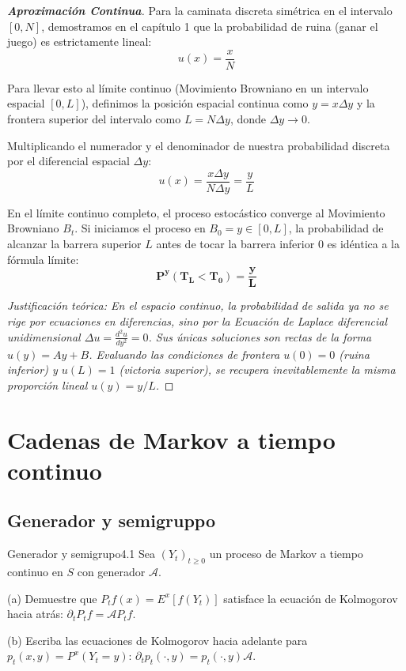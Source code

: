 \documentclass[10pt,a4paper]{article}
\begin{document}
\begin{proof}[\textbf{Aproximación Continua}]
    Para la caminata discreta simétrica en el intervalo $[0, N]$, demostramos en el capítulo 1 que la probabilidad de ruina (ganar el juego) es estrictamente lineal:
    \[ u(x) = \frac{x}{N} \]

    Para llevar esto al límite continuo (Movimiento Browniano en un intervalo espacial $[0, L]$), definimos la posición espacial continua como $y = x \Delta y$ y la frontera superior del intervalo como $L = N \Delta y$, donde $\Delta y \to 0$. 
    
    Multiplicando el numerador y el denominador de nuestra probabilidad discreta por el diferencial espacial $\Delta y$:
    \[ u(x) = \frac{x \Delta y}{N \Delta y} = \frac{y}{L} \]

    En el límite continuo completo, el proceso estocástico converge al Movimiento Browniano $B_t$. Si iniciamos el proceso en $B_0 = y \in [0, L]$, la probabilidad de alcanzar la barrera superior $L$ antes de tocar la barrera inferior $0$ es idéntica a la fórmula límite:
    \[ \mathbf{P^y(T_L < T_0) = \frac{y}{L}} \]
    
    \textit{Justificación teórica: En el espacio continuo, la probabilidad de salida ya no se rige por ecuaciones en diferencias, sino por la Ecuación de Laplace diferencial unidimensional $\Delta u = \frac{d^2u}{dy^2} = 0$. Sus únicas soluciones son rectas de la forma $u(y) = Ay+B$. Evaluando las condiciones de frontera $u(0)=0$ (ruina inferior) y $u(L)=1$ (victoria superior), se recupera inevitablemente la misma proporción lineal $u(y) = y/L$.}
\end{proof}

\newpage

\section{Cadenas de Markov a tiempo continuo}
\subsection{Generador y semigruppo}

\begin{ejercicio}{Generador y semigrupo}{4.1}
    Sea $(Y_t)_{t \ge 0}$ un proceso de Markov a tiempo continuo en $S$ con generador $\mathcal{A}$.
    
    (a) Demuestre que $P_t f(x) = E^x[f(Y_t)]$ satisface la ecuación de Kolmogorov hacia atrás: $\partial_t P_t f = \mathcal{A}P_t f$.
    
    (b) Escriba las ecuaciones de Kolmogorov hacia adelante para $p_t(x,y) = P^x(Y_t = y)$: $\partial_t p_t(\cdot, y) = p_t(\cdot, y)\mathcal{A}$.
\end{ejercicio}
\end{document}
